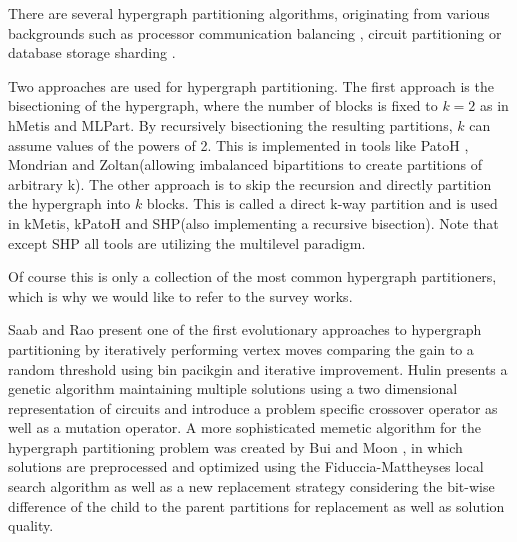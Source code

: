 \documentclass[a4paper,12pt,titlepage, BCOR7mm,headsepline]{scrbook}
\numberwithin{equation}{section}
\begin{document}
There are several hypergraph partitioning algorithms, originating from various backgrounds such as processor communication balancing \cite{catalyurek1999hypergraph}, circuit partitioning \cite{alpert1998multilevel} or database storage sharding \cite{kabiljo2017social}.

Two approaches are used for hypergraph partitioning. The first approach is the bisectioning of the hypergraph, where the number of blocks is fixed to $k=2$ as in hMetis\cite{karypis1999multilevel} and MLPart\cite{alpert1998multilevel}. By recursively bisectioning the resulting partitions, $k$ can assume values of the powers of 2. This is implemented in tools like PatoH \cite{catalyurek1999hypergraph}, Mondrian\cite{vastenhouw2005two} and Zoltan\cite{devine2006parallel}(allowing imbalanced bipartitions to create partitions of arbitrary k). The other approach is to skip the recursion and directly partition the hypergraph into $k$ blocks. This is called a direct k-way partition and is used in kMetis\cite{karypis2000multilevel}, kPatoH \cite{aykanat2008multi} and SHP\cite{kabiljo2017social}(also implementing a recursive bisection). Note that except SHP \cite{kabiljo2017social} all tools are utilizing the multilevel paradigm. 

Of course this is only a collection of the most common hypergraph partitioners, which is why we would like to refer to the survey works\cite{alpert1995recent}\cite{bader2013graph}\cite{papa2007hypergraph}\cite{trifunovic2006parallel}.





Saab and Rao \cite{saab1989evolution} present one of the first evolutionary approaches to hypergraph partitioning by iteratively performing vertex moves comparing the gain to a random threshold using bin pacikgin and iterative improvement. Hulin \cite{hulin1990circuit} presents a genetic algorithm maintaining multiple solutions using a two dimensional representation of circuits and introduce a problem specific crossover operator as well as a mutation operator. A more sophisticated memetic algorithm for the hypergraph partitioning problem was created by Bui and Moon \cite{bui1994fast}, in which solutions are preprocessed and optimized using the Fiduccia-Mattheyses \cite{fiduccia1988linear} local search algorithm as well as a new replacement strategy considering the bit-wise difference of the child to the parent partitions for replacement as well as solution quality. 
\end{document}
